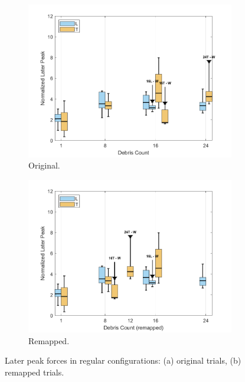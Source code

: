 \documentclass{article}
\begin{document}
\begin{figure}[htbp]
    \centering
    \begin{subfigure}[t]{0.48\textwidth}
        \centering
        \includegraphics[width=\textwidth]{LaterPeak_Regular_SplitByTrial.png}
        \caption{Original.}
        \label{fig:laterpeak_regular_original}
    \end{subfigure}
    \hfill
    \begin{subfigure}[t]{0.48\textwidth}
        \centering
        \includegraphics[width=\textwidth]{LaterPeak_Regular_RemappedT.png}
        \caption{Remapped.}
        \label{fig:laterpeak_regular_remap}
    \end{subfigure}
    \caption{Later peak forces in regular configurations: (a) original trials, (b) remapped trials.}
    \label{fig:laterpeak_regular_split}
\end{figure}
\end{document}
